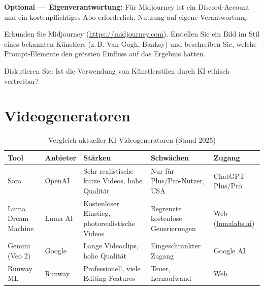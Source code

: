 \begin{mychallenge}
\begin{myattention}
\textbf{Optional --- Eigenverantwortung:} Für Midjourney ist ein Discord-Account
und ein kostenpflichtiges Abo erforderlich. Nutzung auf eigene Verantwortung.
\end{myattention}

Erkunden Sie Midjourney (\url{https://midjourney.com}). Erstellen Sie ein Bild
im Stil eines bekannten Künstlers (z.\,B. Van Gogh, Banksy) und beschreiben Sie,
welche Prompt-Elemente den grössten Einfluss auf das Ergebnis hatten.

Diskutieren Sie: Ist die Verwendung von Künstlerstilen durch KI ethisch
vertretbar?
\end{mychallenge}

\section{Videogeneratoren}

\begin{table}[H]
\centering
\caption{Vergleich aktueller KI-Videogeneratoren (Stand 2025)}
\label{tab:videogen-vergleich}
\small
\begin{tabular}{p{2.5cm}p{2cm}p{3.5cm}p{3.5cm}p{2cm}}
    \toprule
    \textbf{Tool}   & \textbf{Anbieter} & \textbf{Stärken}                               & \textbf{Schwächen}                           & \textbf{Zugang}    \\
    \midrule
    Sora            & OpenAI            & Sehr realistische kurze Videos, hohe Qualität   & Nur für Plus/Pro-Nutzer, USA                 & ChatGPT Plus/Pro   \\
    \midrule
    Luma Dream Machine & Luma AI        & Kostenloser Einstieg, photorealistische Videos  & Begrenzte kostenlose Generierungen           & Web (\url{lumalabs.ai}) \\
    \midrule
    Gemini (Veo 2)  & Google           & Lange Videoclips, hohe Qualität                 & Eingeschränkter Zugang                       & Google AI          \\
    \midrule
    Runway ML       & Runway           & Professionell, viele Editing-Features           & Teuer, Lernaufwand                           & Web               \\
    \bottomrule
\end{tabular}
\end{table}


